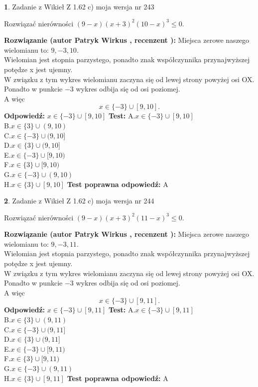 \documentclass[12pt, a4paper]{article}
\theoremstyle{definition} %
\newtheorem{zad}{}
\newcommand{\zadStart}[1]{\begin{zad}#1\newline}
\newcommand{\zadStop}{\end{zad}}
\newcommand{\rozwStart}[2]{\noindent \textbf{Rozwiązanie (autor #1 , recenzent #2): }\newline}
\newcommand{\rozwStop}{\newline}
\newcommand{\odpStart}{\noindent \textbf{Odpowiedź:}\newline}
\newcommand{\odpStop}{\newline}
\newcommand{\testStart}{\noindent \textbf{Test:}\newline}
\newcommand{\testStop}{\newline}
\newcommand{\kluczStart}{\noindent \textbf{Test poprawna odpowiedź:}\newline}
\newcommand{\kluczStop}{\newline}
\begin{document}
\zadStart{Zadanie z Wikieł Z 1.62 c) moja wersja nr 243}

Rozwiązać nierówności $(9-x)(x+3)^{2}(10-x)^{3}\le0$.
\zadStop
\rozwStart{Patryk Wirkus}{}
Miejsca zerowe naszego wielomianu to: $9, -3, 10$.\\
Wielomian jest stopnia parzystego, ponadto znak współczynnika przy\linebreak najwyższej potędze x jest ujemny.\\ W związku z tym wykres wielomianu zaczyna się od lewej strony powyżej osi OX.\\
Ponadto w punkcie $-3$ wykres odbija się od osi poziomej.\\
A więc $$x \in \{-3\} \cup [9,10].$$
\rozwStop
\odpStart
$x \in \{-3\} \cup [9,10]$
\odpStop
\testStart
A.$x \in \{-3\} \cup [9,10]$\\
B.$x \in \{3\} \cup (9,10)$\\
C.$x \in \{-3\} \cup (9,10]$\\
D.$x \in \{3\} \cup (9,10]$\\
E.$x \in \{-3\} \cup [9,10)$\\
F.$x \in \{3\} \cup [9,10)$\\
G.$x \in \{-3\} \cup (9,10)$\\
H.$x \in \{3\} \cup [9,10]$
\testStop
\kluczStart
A
\kluczStop



\zadStart{Zadanie z Wikieł Z 1.62 c) moja wersja nr 244}

Rozwiązać nierówności $(9-x)(x+3)^{2}(11-x)^{3}\le0$.
\zadStop
\rozwStart{Patryk Wirkus}{}
Miejsca zerowe naszego wielomianu to: $9, -3, 11$.\\
Wielomian jest stopnia parzystego, ponadto znak współczynnika przy\linebreak najwyższej potędze x jest ujemny.\\ W związku z tym wykres wielomianu zaczyna się od lewej strony powyżej osi OX.\\
Ponadto w punkcie $-3$ wykres odbija się od osi poziomej.\\
A więc $$x \in \{-3\} \cup [9,11].$$
\rozwStop
\odpStart
$x \in \{-3\} \cup [9,11]$
\odpStop
\testStart
A.$x \in \{-3\} \cup [9,11]$\\
B.$x \in \{3\} \cup (9,11)$\\
C.$x \in \{-3\} \cup (9,11]$\\
D.$x \in \{3\} \cup (9,11]$\\
E.$x \in \{-3\} \cup [9,11)$\\
F.$x \in \{3\} \cup [9,11)$\\
G.$x \in \{-3\} \cup (9,11)$\\
H.$x \in \{3\} \cup [9,11]$
\testStop
\kluczStart
A
\kluczStop
\end{document}
